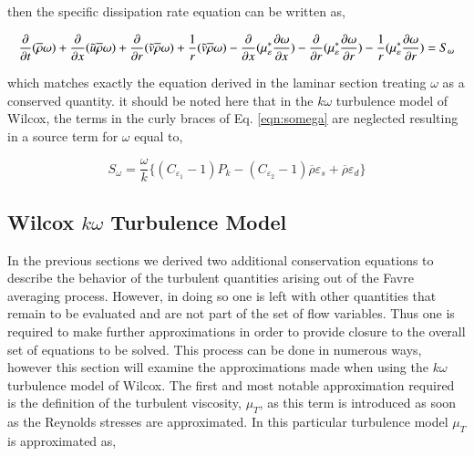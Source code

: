 	then the specific dissipation rate equation can be written as,

\begin{equation}
	 \frac{\partial}{\partial t}(\overline{\rho}\omega)
	+ \frac{\partial}{\partial x}(\tilde u\overline{\rho}\omega)+ \frac{\partial}{\partial r}(\tilde v\overline{\rho}\omega)
	+ \frac{1}{r}(\tilde v\overline{\rho}\omega) \\ \\
	- \frac{\partial}{\partial x}(\mu^*_{\varepsilon}
	\frac{\partial \omega}{\partial x}) - \frac{\partial}{\partial r}(\mu^*_{\varepsilon}\frac{\partial \omega}{\partial r})
	- \frac{1}{r}(\mu^*_{\varepsilon}\frac{\partial \omega}{\partial r})
	 =  S_\omega
\label{eqn:spdissipation}
\end{equation}

	which matches exactly the equation derived in the laminar section treating $\omega$ as a conserved quantity.  it should
be noted here that in the $k\omega$ turbulence model of Wilcox, the terms in the curly braces of Eq. \ref{eqn:somega} are
neglected resulting in a source term for $\omega$ equal to,

\begin{equation}
	S_\omega = \frac{\omega}{k}\Big\{(C_{\varepsilon_1}- 1)P_k - (C_{\varepsilon_2}-1)\overline{\rho}\varepsilon_s
		+ \overline{\rho}\varepsilon_d \Big\}
\label{eqn:somega2}
\end{equation}

\subsection{Wilcox $k\omega$ Turbulence Model}

	In the previous sections we derived two additional conservation equations to describe the behavior of 
the turbulent quantities arising out of the Favre averaging process.  However, in doing so one is left with other 
quantities that remain to be evaluated and are not part of the set of flow variables.  Thus one is required to 
make further approximations in order to provide closure to the overall set of equations to be solved.  This process
can be done in numerous ways, however this section will examine the approximations made when using the $k\omega$ 
turbulence model of Wilcox.  The first and most notable approximation required is the definition of the 
turbulent viscosity, $\mu_T$, as this term is introduced as soon as the Reynolds stresses are
approximated.  In this particular turbulence model $\mu_T$ is approximated as,

